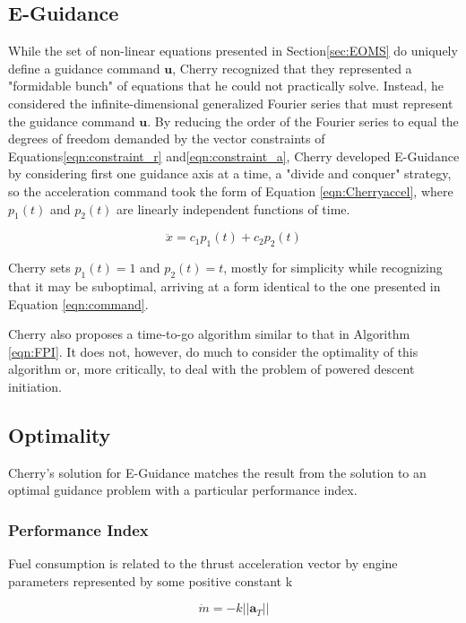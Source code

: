 \subsection{E-Guidance}
While the set of non-linear equations presented in Section\:\ref{sec:EOMS} do uniquely define a guidance command $\bm{u}$, Cherry recognized that they represented a "formidable bunch" of equations that he could not practically solve. Instead, he considered the infinite-dimensional generalized Fourier series that must represent the guidance command $\bm{u}$. By reducing the order of the Fourier series to equal the degrees of freedom demanded by the vector constraints of Equations\:\ref{eqn:constraint_r} and\:\ref{eqn:constraint_a}, Cherry developed E-Guidance by considering first one guidance axis at a time, a "divide and conquer" strategy, so the acceleration command took the form of Equation \ref{eqn:Cherryaccel}, where $p_1(t)$ and $p_2(t)$ are linearly independent functions of time.

\begin{equation}
\label{eqn:Cherryaccel}
\ddot{x} = c_1p_1(t) + c_2p_2(t)
\end{equation}

Cherry sets $p_1(t) = 1$ and $p_2(t) = t$, mostly for simplicity while recognizing that it may be suboptimal, arriving at a form identical to the one presented in Equation \ref{eqn:command}. 

Cherry also proposes a time-to-go algorithm similar to that in Algorithm \ref{eqn:FPI}. It does not, however, do much to consider the optimality of this algorithm or, more critically, to deal with the problem of powered descent initiation.

\subsection{Optimality}
Cherry's solution for E-Guidance matches the result from the solution to an optimal guidance problem with a particular performance index.

\subsubsection{Performance Index}
Fuel consumption is related to the thrust acceleration vector by engine parameters represented by some positive constant k

\begin{equation}
\label{eqn:fuel_rate}
\dot{m} = -k ||\bm{a}_T||
\end{equation}

